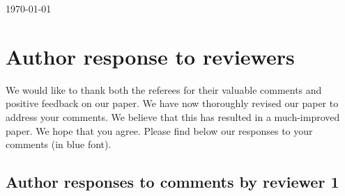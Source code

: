 \documentclass[10pt,a4paper]{article}
\begin{document}
\today

\section*{Author response to reviewers}

We would like to thank both the referees for their valuable comments and positive feedback on our paper. We have now thoroughly revised our paper to address your comments. We believe that this has resulted in a much-improved paper. We hope that you agree. Please find below our responses to your comments (in {\color{blue} blue} font).

\subsection*{Author responses to comments by reviewer 1}
\end{document}
